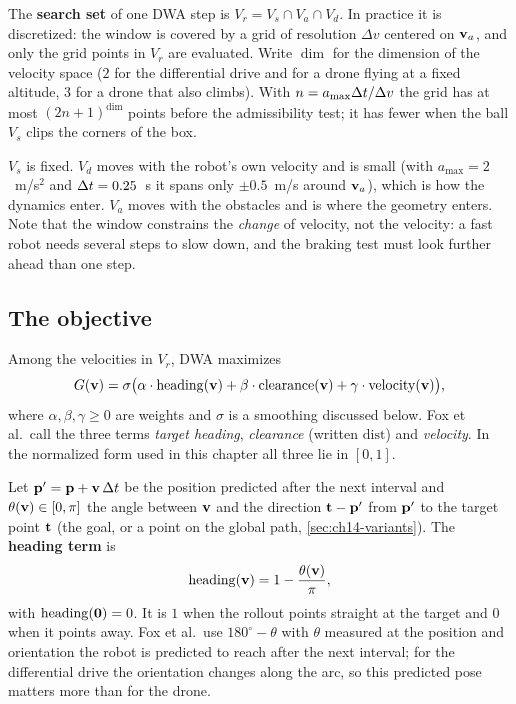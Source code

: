 \begin{definition}
\label{def:ch14-search-set}
The \textbf{search set} of one DWA step is
$V_r = V_s \cap V_a \cap V_d$. In practice it is discretized: the window is
covered by a grid of resolution $\Delta v$ centered on $\mathbf{v}_a$, and only the
grid points in $V_r$ are evaluated. Write $\dim$ for the dimension of the
velocity space ($2$ for the differential drive and for a drone flying at a
fixed altitude, $3$ for a drone that also climbs). With
$n = a_{\max}\Delta t/\Delta v$ the grid has at most $(2n+1)^{\!\dim}$ points before
the admissibility test; it has fewer when the ball $V_s$ clips the corners of
the box.
\end{definition}

$V_s$ is fixed. $V_d$ moves with the robot's own velocity and is small
(with $a_{\max} = 2$~m/s$^2$ and $\Delta t = 0.25$~s it spans only $\pm 0.5$~m/s
around $\mathbf{v}_a$), which is how the dynamics enter. $V_a$ moves with the
obstacles and is where the geometry enters. Note that the window constrains
the \emph{change} of velocity, not the velocity: a fast robot needs several
steps to slow down, and the braking test must look further ahead than one
step.

\subsection{The objective}
\label{sec:ch14-objective}

Among the velocities in $V_r$, DWA maximizes
\begin{equation}
  G(\mathbf{v}) = \sigma\bigl(\alpha \cdot \mathrm{heading}(\mathbf{v})
             + \beta \cdot \mathrm{clearance}(\mathbf{v})
             + \gamma \cdot \mathrm{velocity}(\mathbf{v})\bigr),
  \label{eq:ch14-G}
\end{equation}
where $\alpha, \beta, \gamma \ge 0$ are weights and $\sigma$ is a smoothing
discussed below. Fox et al.\ call the three
terms \emph{target heading}, \emph{clearance} (written $\mathrm{dist}$) and
\emph{velocity}. In the normalized form used in this chapter all three lie
in $[0, 1]$.

\begin{definition}
\label{def:ch14-heading}
Let $\mathbf{p}' = \mathbf{p} + \mathbf{v}\,\Delta t$ be the position predicted after the next
interval and $\theta(\mathbf{v}) \in [0, \pi]$ the angle between $\mathbf{v}$ and the
direction $\mathbf{t} - \mathbf{p}'$ from $\mathbf{p}'$ to the target point $\mathbf{t}$
(the goal, or a point on the global path, \cref{sec:ch14-variants}). The
\textbf{heading term} is
\begin{equation}
  \mathrm{heading}(\mathbf{v}) = 1 - \frac{\theta(\mathbf{v})}{\pi},
  \label{eq:ch14-heading}
\end{equation}
with $\mathrm{heading}(\mathbf{0}) = 0$. It is $1$ when the rollout points
straight at the target and $0$ when it points away. Fox et al.\ use
$180^\circ - \theta$ with $\theta$ measured at the position and orientation
the robot is predicted to reach after the next interval; for the
differential drive the orientation changes along the arc, so this predicted
pose matters more than for the drone.
\end{definition}


